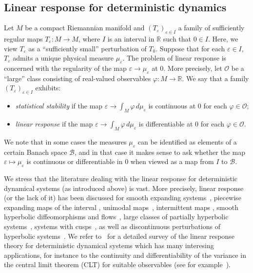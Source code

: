 \documentclass[11pt,reqno,a4paper]{article}
\theoremstyle{special}
\renewcommand{\epsilon}{\varepsilon}
\def\R{\mathbb{R}}
\def\B{\mathcal{B}}
\begin{document}
\subsection{Linear response for deterministic dynamics}
Let $M$ be a compact Riemannian manifold and $(T_\varepsilon)_{\varepsilon \in I}$ a family of sufficiently regular maps $T_{\varepsilon}\colon M\to M$, where $I$ is an interval in $\R$ such that $0\in I$. Here, we  view $T_\varepsilon$ as a ``sufficiently small'' perturbation of $T_0$. Suppose that for each $\varepsilon \in I$, $T_\varepsilon$ admits a unique physical measure $\mu_\varepsilon$. The problem of linear response is concerned with the regularity of the map $\varepsilon \to \mu_\varepsilon$ at $0$. More precisely, let $\mathcal O$ be a ``large'' class consisting of real-valued observables $\varphi \colon M\to \mathbb R$. We say that a family $(T_\varepsilon)_{\varepsilon \in I}$ exhibits:
\begin{itemize}
\item \emph{statistical stability} if the map $\varepsilon \to \int_M \varphi \, d\mu_\varepsilon$ is continuous at $0$ for each $\varphi \in \mathcal O$;
\item \emph{linear response} if the map $\varepsilon \to \int_M \varphi\, d\mu_\varepsilon$ is differentiable at $0$ for each $\varphi \in \mathcal O$.
\end{itemize}
We note that in some cases the measures $\mu_\varepsilon$ can be identified as elements of a certain Banach space $\B$, and in that case it makes sense to ask whether the map $\varepsilon \mapsto \mu_\varepsilon$ is continuous or differentiable in $0$ when viewed as a map from $I$ to $\mathcal B$.

We stress that the literature dealing with the linear response for deterministic dynamical systems (as introduced above) is vast.  More precisely,  linear response (or the lack of it) has been discussed for smooth expanding 
	systems~\cite{B2,Baladibook,S}, piecewise expanding maps of the interval \cite{B1,BS1}, unimodal maps~\cite{BS2, LS}, intermittent maps \cite{BahSau,BT, L, K}, smooth hyperbolic diffeomorphisms and flows~\cite{BL1, BL2, GL, Ruelle97}, large classes of partially hyperbolic systems~\cite{Dol}, systems with cusps~\cite{BG}, as well as discontinuous perturbations of hyperbolic systems~\cite{C}. We refer to~\cite{B2} for a detailed survey of the linear response theory for deterministic dynamical systems which has many interesing applications, for instance to the continuity and differentiability of the variance in the central limit theorem (CLT) for suitable observables (see for example~\cite{bomfim2016, GKLM}).
\end{document}
